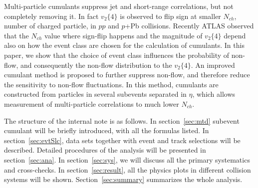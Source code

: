 Multi-particle cumulants suppress jet and short-range correlations, but not completely removing it. In fact $v_{2}\{4\}$ is observed to flip sign at smaller $N_{ch}$, number of charged particle, in $pp$ and $p$+Pb collisions. Recently ATLAS observed that the $N_{ch}$ value where sign-flip happens and the magnitude of $v_{2}\{4\}$ depend also on how the event class are chosen for the calculation of cumulants. In this paper, we show that the choice of event class influences the probability of non-flow, and consequently the non-flow distribution to the $v_{2}\{4\}$. An improved cumulant method is proposed to further suppress non-flow, and therefore reduce the sensitivity to non-flow fluctuations. In this method, cumulants are constructed from particles in several subevents separated in $\eta$, which allows measurement of multi-particle correlations to much lower $N_{ch}$.

The structure of the internal note is as follows. In section~\ref{sec:mtd} subevent cumulant will be briefly introduced, with all the formulas listed. In section~\ref{sec:evtSlc}, data sets together with event and track selections will be described. Detailed procedures of the analysis will be presented in section~\ref{sec:ana}. In section~\ref{sec:sys}, we will discuss all the primary systematics and cross-checks. In section~\ref{sec:result}, all the physics plots in different collision systems will be shown. Section~\ref{sec:summary} summarizes the whole analysis.






